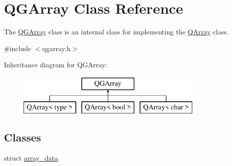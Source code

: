 \hypertarget{class_q_g_array}{}\section{Q\+G\+Array Class Reference}
\label{class_q_g_array}


The \mbox{\hyperlink{class_q_g_array}{Q\+G\+Array}} class is an internal class for implementing the \mbox{\hyperlink{class_q_array}{Q\+Array}} class.  




{\ttfamily \#include $<$qgarray.\+h$>$}

Inheritance diagram for Q\+G\+Array\+:\begin{figure}[H]
\begin{center}
\leavevmode
\includegraphics[height=2.000000cm]{class_q_g_array}
\end{center}
\end{figure}
\subsection*{Classes}
\begin{DoxyCompactItemize}
\item 
struct \mbox{\hyperlink{struct_q_g_array_1_1array__data}{array\+\_\+data}}
\end{DoxyCompactItemize}
